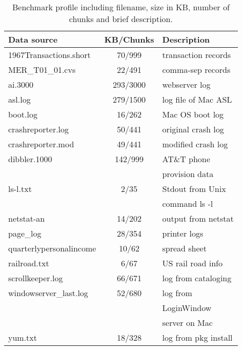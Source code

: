 \begin{table}
\begin{center}
\begin{tabular}{|l||c|l|} \hline
Data source		& KB/Chunks		& Description\\ \hline \hline
1967Transactions.short	& 70/999		& transaction records\\ \hline
MER\_T01\_01.cvs	& 22/491 	& comma-sep records\\ \hline
ai.3000			& 293/3000	& webserver log\\ \hline
asl.log 		& 279/1500	& log file of Mac ASL\\ \hline	
boot.log		& 16/262		& Mac OS boot log\\ \hline
crashreporter.log 	& 50/441 	& original crash log\\ \hline 
crashreporter.mod 	& 49/441	& modified crash log\\ \hline
dibbler.1000		& 142/999 	& AT\&T phone\\
			&		& provision data\\ \hline
ls-l.txt		& 2/35		& Stdout from Unix\\
			&		& command ls -l\\ \hline
netstat-an		& 14/202		& output from netstat\\ \hline
page\_log		& 28/354		& printer logs\\ \hline
quarterlypersonalincome	& 10/62		& spread sheet\\ \hline 
railroad.txt		& 6/67		& US rail road info\\ \hline
scrollkeeper.log 	& 66/671		& log from cataloging\\ \hline
windowserver\_last.log 	& 52/680		& log from\\
                        &               & LoginWindow\\
                        &               & server on Mac\\ \hline
yum.txt			& 18/328		& log from pkg install\\ \hline
\end{tabular}
\caption{Benchmark profile including filename, size in KB, number of chunks
and brief description.} \shrink
\label{tab:benchmarks} 
\end{center}
\end{table}

